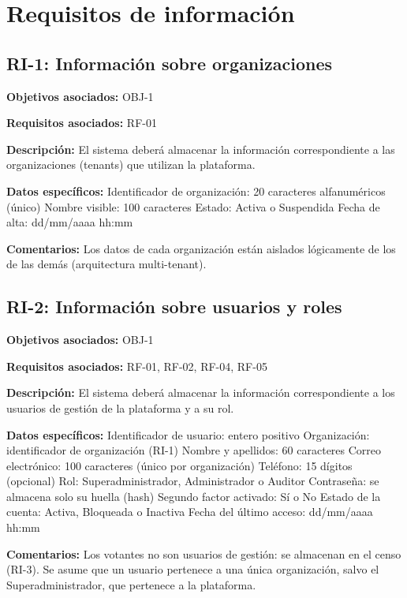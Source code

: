 \section{Requisitos de información}
\label{sec:datos-detallados}

\subsection{RI-1: Información sobre organizaciones}

\textbf{Objetivos asociados:} OBJ-1\par
\textbf{Requisitos asociados:} RF-01\par
\textbf{Descripción:} El sistema deberá almacenar la información correspondiente a las organizaciones (tenants) que utilizan la plataforma.\par
\textbf{Datos específicos:} Identificador de organización: 20 caracteres alfanuméricos (único) Nombre visible: 100 caracteres Estado: Activa o Suspendida Fecha de alta: dd/mm/aaaa hh:mm\par
\textbf{Comentarios:} Los datos de cada organización están aislados lógicamente de los de las demás (arquitectura multi-tenant).\par

\subsection{RI-2: Información sobre usuarios y roles}

\textbf{Objetivos asociados:} OBJ-1\par
\textbf{Requisitos asociados:} RF-01, RF-02, RF-04, RF-05\par
\textbf{Descripción:} El sistema deberá almacenar la información correspondiente a los usuarios de gestión de la plataforma y a su rol.\par
\textbf{Datos específicos:} Identificador de usuario: entero positivo Organización: identificador de organización (RI-1) Nombre y apellidos: 60 caracteres Correo electrónico: 100 caracteres (único por organización) Teléfono: 15 dígitos (opcional) Rol: Superadministrador, Administrador o Auditor Contraseña: se almacena solo su huella (hash) Segundo factor activado: Sí o No Estado de la cuenta: Activa, Bloqueada o Inactiva Fecha del último acceso: dd/mm/aaaa hh:mm\par
\textbf{Comentarios:} Los votantes no son usuarios de gestión: se almacenan en el censo (RI-3). Se asume que un usuario pertenece a una única organización, salvo el Superadministrador, que pertenece a la plataforma.\par

